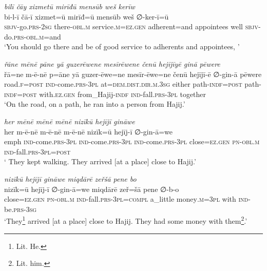 \ea \label{ŽP.92}
\textit{bilī čāy xizmetū mirīđū mensūb weš kerīw} \\ 
\gll bi-l-ī čā-ī xizmet=ū mirīđ=ū mensūb weš ∅-ker-ī=ū \\ 
 \textsc{sbjv-}go\textsc{.prs}-\textsc{2sg} there\textsc{-obl}\textsc{.m} service\textsc{.m}\textsc{\textsc{=ez.gen}} adherent=and appointees well \textsc{sbjv-}do\textsc{.prs}\textsc{-obl}\textsc{.m}=and \\ 
\glt `You should go there and be of good service to adherents and appointees, '
\z 
 
\ea \label{ŽP.97}
\textit{řāne mēnē pāne yā guzerēwene mesīrēwene čenū hejījīyē ginā pēwere} \\ 
\gll řā=ne m-ē-nē p=āne yā guzer-ēwe=ne mesīr-ēwe=ne čenū hejījī-ē ∅-gin-ā pēwere \\ 
 road\textsc{.f}\textsc{=\textsc{post}} \textsc{ind-}come\textsc{.prs}\textsc{-3pl} at=\textsc{dem.dist}\textsc{.dir}\textsc{.m}\textsc{.3sg} either path\textsc{-indf}\textsc{=\textsc{post}} path\textsc{-indf}\textsc{=\textsc{post}} with\textsc{.ez.gen} from\_Hajij\textsc{-indf} \textsc{ind-}fall\textsc{.prs}\textsc{-3pl} together \\ 
\glt `On the road, on a path, he ran into a person from Hajij.'
\z 
 
\ea \label{ŽP.100}
\textit{her mēnē mēnē mēnē nizīkū hejījī gināwe} \\ 
\gll her m-ē-nē m-ē-nē m-ē-nē nizīk=ū hejīj-ī ∅-gin-ā=we \\ 
 emph \textsc{ind-}come\textsc{.prs}\textsc{-3pl} \textsc{ind-}come\textsc{.prs}\textsc{-3pl} \textsc{ind-}come\textsc{.prs}\textsc{-3pl} close\textsc{\textsc{=ez.gen}} \textsc{pn}\textsc{-obl}\textsc{.m} \textsc{ind-}fall\textsc{.prs}\textsc{-3pl}\textsc{=\textsc{post}} \\ 
\glt ` They kept walking. They arrived [at a place] close to Hajij.'
\z 
 
\ea \label{ŽP.101}
\textit{nizīkū hejījī gināwe miqdārē zeřšā pene bo} \\ 
\gll nizīk=ū hejīj-ī ∅-gin-ā=we miqdārē zeř=šā pene ∅-b-o \\ 
 close\textsc{\textsc{=ez.gen}} \textsc{pn}\textsc{-obl}\textsc{.m} \textsc{ind-}fall\textsc{.prs}\textsc{-3pl}\textsc{=compl} a\_little money\textsc{.m}\textsc{=3pl} with \textsc{ind-}be\textsc{.prs}\textsc{-3sg} \\ 
\glt `They\footnote{Lit. He.} arrived [at a place] close to Hajij. They had some money with them\footnote{Lit. him.}.'
\z 
 
